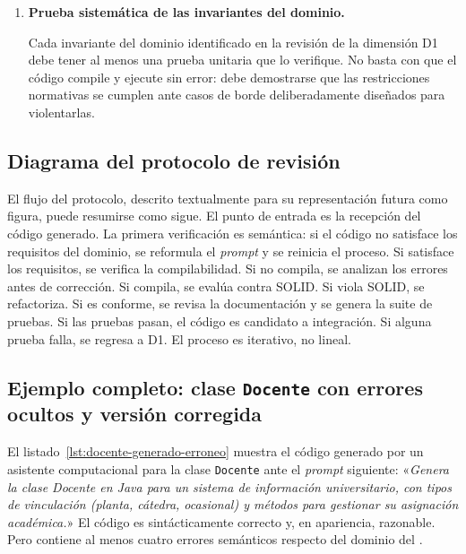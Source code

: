 \begin{enumerate}[label=\textbf{D\arabic*.}, leftmargin=2.5cm]
  \item \textbf{Prueba sistemática de las invariantes del dominio.}

        Cada invariante del dominio identificado en la revisión de la
        dimensión D1 debe tener al menos una prueba unitaria que lo verifique.
        No basta con que el código compile y ejecute sin error: debe demostrarse
        que las restricciones normativas se cumplen ante casos de borde
        deliberadamente diseñados para violentarlas.

\end{enumerate}

\subsection{Diagrama del protocolo de revisión}
\label{subsec:diagrama-protocolo}

El flujo del protocolo, descrito textualmente para su representación futura
como figura, puede resumirse como sigue. El punto de entrada es la recepción
del código generado. La primera verificación es semántica: si el código no
satisface los requisitos del dominio, se reformula el \textit{prompt} y se
reinicia el proceso. Si satisface los requisitos, se verifica la compilabilidad.
Si no compila, se analizan los errores antes de corrección. Si compila, se
evalúa contra SOLID. Si viola SOLID, se refactoriza. Si es conforme, se
revisa la documentación y se genera la suite de pruebas. Si las pruebas pasan,
el código es candidato a integración. Si alguna prueba falla, se regresa a D1.
El proceso es iterativo, no lineal.

\subsection{Ejemplo completo: clase \texttt{Docente} con errores ocultos y versión corregida}
\label{subsec:ejemplo-docente}

El listado~\ref{lst:docente-generado-erroneo} muestra el código generado
por un asistente computacional para la clase \texttt{Docente} ante el
\textit{prompt} siguiente: «\textit{Genera la clase Docente en Java para
un sistema de información universitario, con tipos de vinculación (planta,
cátedra, ocasional) y métodos para gestionar su asignación académica.}»
El código es sintácticamente correcto y, en apariencia, razonable. Pero
contiene al menos cuatro errores semánticos respecto del dominio del \acuerdo.

